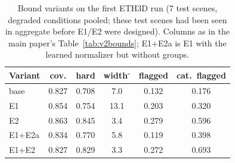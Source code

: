 \begin{table}[!htbp]\centering\footnotesize
\caption{Bound variants on the first ETH3D run (7 test scenes, degraded conditions pooled; these test scenes had been seen in aggregate before E1/E2 were designed). Columns as in the main paper's Table~\ref{tab:v2bounds}; E1+E2a is E1 with the learned normalizer but without groups.}\label{tab:s5run1}
\begin{tabular}{lccccc}\toprule
Variant & cov. & hard & width$^\circ$ & flagged & cat.\ flagged \\\midrule
base & 0.827 & 0.708 & 7.0 & 0.132 & 0.176 \\
E1 & 0.854 & 0.754 & 13.1 & 0.203 & 0.320 \\
E2 & 0.863 & 0.845 & 3.4 & 0.279 & 0.596 \\
E1+E2a & 0.834 & 0.770 & 5.8 & 0.119 & 0.398 \\
E1+E2 & 0.827 & 0.829 & 3.3 & 0.272 & 0.693 \\
\bottomrule\end{tabular}\end{table}

